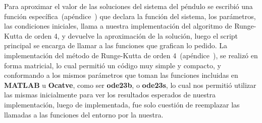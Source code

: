 
Para aproximar el valor de las soluciones del sistema del péndulo se escribió una función específica~(apéndice~) que declara la función del sistema, los parámetros, las condiciones iniciales, llama a nuestra implementación del algoritmo de Runge-Kutta de orden 4, y devuelve la aproximación de la solución, luego el script principal se encarga de llamar a las funciones que grafican lo pedido.
La implementación del método de Runge-Kutta de orden 4~(apéndice~), se realizó en forma matricial, lo cual permitió un código muy simple y compacto, y conformando a los mismos parámetros que toman las funciones incluidas en \textbf{MATLAB} u \textbf{Ocatve}, como ser \textbf{ode23b}, o \textbf{ode23s}, lo cual nos permitió utilizar las mismas inicialmente para ver los resultados esperados de nuestra implementación, luego de implementada, fue solo cuestión de reemplazar las llamadas a las funciones del entorno por la nuestra. 





\clearpage
